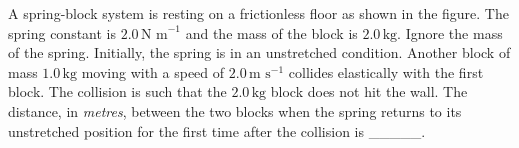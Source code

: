 
\item A spring-block system is resting on a frictionless floor as shown in the figure. The spring constant is \(2.0 \, \text{N m}^{-1}\) and the mass of the block is \(2.0 \, \text{kg}\). Ignore the mass of the spring. Initially, the spring is in an unstretched condition. Another block of mass \(1.0 \, \text{kg}\) moving with a speed of \(2.0 \, \text{m s}^{-1}\) collides elastically with the first block. The collision is such that the \(2.0 \, \text{kg}\) block does not hit the wall. The distance, in \textit{metres}, between the two blocks when the spring returns to its unstretched position for the first time after the collision is \_\_\_\_\_.
\begin{center}
\end{center}
